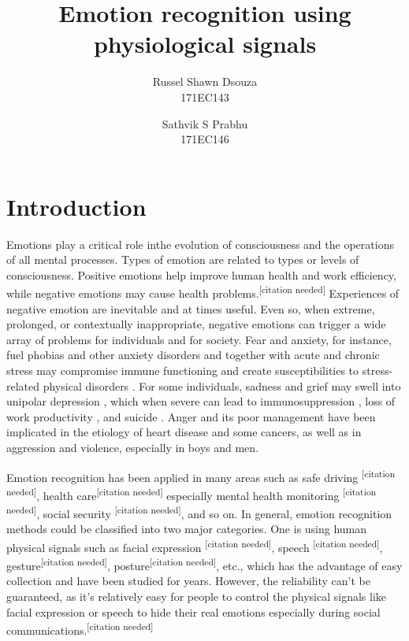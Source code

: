 \documentclass[11pt]{article}
\title{\textbf{Emotion recognition using physiological signals}}
\author{
  Russel Shawn Dsouza\\
  171EC143
  \and
  Sathvik S Prabhu\\
  171EC146
}
\date{}
\theoremstyle{definition}
\begin{document}
  \maketitle

  \section{Introduction}
    Emotions play a critical role inthe evolution of consciousness and the operations of all mental processes. Types of emotion are related to types or levels of consciousness.\cite{izard_emotion_2009}
    Positive emotions help improve human health and work efficiency, while negative emotions may cause health problems.\textsuperscript{[citation needed]}
    Experiences of negative emotion are inevitable and at times useful. Even so, when extreme, prolonged, or contextually inappropriate, negative emotions can trigger a wide array of problems for individuals and for society. 
    Fear and anxiety, for instance, fuel phobias and other anxiety disorders \cite{ohman_automatic_1993} and together with acute and chronic stress may compromise immune functioning and create susceptibilities to stress-related physical disorders \cite{oleary_stress_1990}. 
    For some individuals, sadness and grief may swell into unipolar depression \cite{nolen-hoeksema_response_1993}, which when severe can lead to immunosuppression \cite{oleary_stress_1990}, loss of work productivity \cite{coryell_enduring_1993}, and suicide \cite{chen_lifetime_1996}. 
    Anger and its poor management have been implicated in the etiology of heart disease\cite{barefoot_hostility_1983}\cite{fredrickson2000hostility}\cite{scheier_person_1995} and some cancers\cite{eysenck_cancer_1994}\cite{greer_psychological_1975}, as well as in aggression and violence, especially in boys and men\cite{buss_evolution_2016}\cite{lemerise_development_2008}.

    Emotion recognition has been applied in many areas such as safe driving \textsuperscript{[citation needed]}, health care\textsuperscript{[citation needed]} especially mental health monitoring \textsuperscript{[citation needed]}, social security \textsuperscript{[citation needed]}, and so on. 
    In general, emotion recognition methods could be classified into two major categories. 
    One is using human physical signals such as facial expression \textsuperscript{[citation needed]}, speech \textsuperscript{[citation needed]}, gesture\textsuperscript{[citation needed]}, posture\textsuperscript{[citation needed]}, etc., which has the advantage of easy collection and have been studied for years. 
    However, the reliability can’t be guaranteed, as it’s relatively easy for people to control the physical signals like facial expression or speech to hide their real emotions especially during social communications.\textsuperscript{[citation needed]}
\end{document}
